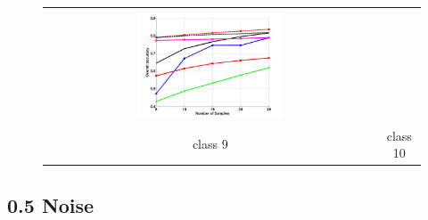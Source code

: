 \begin{figure}[h]
\begin{tabular}{cc}
		\includegraphics[width=0.45\textwidth]{appendix/tables/MNIST_Rate_3_class_10.jpg} \\
		class 9 & class 10\\
	\end{tabular}
\end{figure}
\clearpage



\subsection{0.5 Noise}
